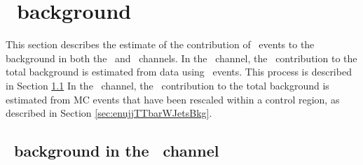 \section{\ttbar~background}
\label{sec:ttbar}

This section describes the estimate
of the contribution of \ttbar~events to the 
background in both the \eejj~and \enujj~channels.
In the \eejj~channel, the \ttbar~contribution
to the total background is estimated from data using 
\emujj~events.  This process is described in Section
\ref{sec:eejjTTbarBkg} 
In the \enujj~channel, the \ttbar~contribution to the total
background is estimated from MC events that have been
rescaled within a control region, as described
in Section \ref{sec:enujjTTbarWJetsBkg}.

\subsection{\ttbar~background in the \eejj~channel} 
\label{sec:eejjTTbarBkg}    


